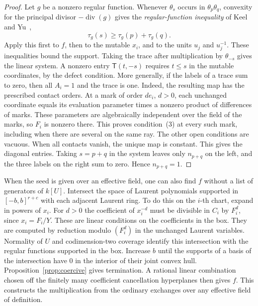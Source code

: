 \documentclass[11pt,reqno]{amsart}
\numberwithin{equation}{section}
\theoremstyle{definition}
\theoremstyle{remark}
\begin{document}
\begin{proof}
Let \(g\) be a nonzero regular function. Whenever \(\theta_s\) occurs in
\(\theta_p\theta_q\), convexity for the principal divisor
\(-\operatorname{div}(g)\) gives the \emph{regular-function inequality}
of Keel and Yu~\cite[Theorem~15.7(2)]{KY},
\begin{equation}\label{eq:regular-function-inequality}
\tau_g(s)\ge\tau_g(p)+\tau_g(q).
\end{equation}
Apply this first to \(f\), then to the
mutable \(x_i\), and to the units \(u_j\) and \(u_j^{-1}\).
These inequalities bound the support. Taking the trace after
multiplication by \(\theta_{-s}\) gives the linear system. A nonzero entry \(\mathsf T(t,-s)\) requires \(t\le s\) in the
mutable coordinates, by the defect condition. More generally, if the
labels of a trace sum to zero, then all \(A_i=1\) and the trace is one.
Indeed, the resulting map has the prescribed contact orders. At a mark
of order \(d e_i\), \(d>0\), each unchanged coordinate equals its
evaluation parameter times a nonzero product of differences of marks.
These parameters are algebraically independent over the field of the
marks, so \(F_i\) is nonzero there. This proves condition~(3) at
every such mark, including when there are several on the same ray.
The other open conditions are vacuous. When all contacts vanish, the unique
map is constant. This gives the diagonal entries. Taking \(s=p+q\)
in the system leaves only \(n_{p+q}\) on the left, and the three
labels on the right sum to zero. Hence \(n_{p+q}=1\).
\end{proof}

When the seed is given over an effective field, one can also find
\(f\) without a list of generators of \(k[U]\). Intersect the space
of Laurent polynomials supported in \([-b,b]^{r+c}\) with each
adjacent Laurent ring. To do this on the \(i\)-th chart, expand in
powers of \(x_i\). For \(d>0\) the coefficient of \(x_i^{-d}\)
must be divisible in \(C_i\) by \(F_i^d\), since \(x_i=F_i/Y\).
These are linear conditions on the coefficients in the box. They
are computed by reduction modulo \((F_i^d)\) in the unchanged
Laurent variables. Normality of \(U\) and codimension-two coverage
identify this intersection with the regular functions supported in
the box. Increase \(b\) until the supports of a basis of the
intersection have \(0\) in the interior of their joint convex hull.
Proposition~\ref{prop:coercive} gives termination. A rational linear
combination chosen off the finitely many coefficient cancellation
hyperplanes then gives \(f\). This constructs the multiplication from the ordinary exchanges over any effective field of definition.
\end{document}
